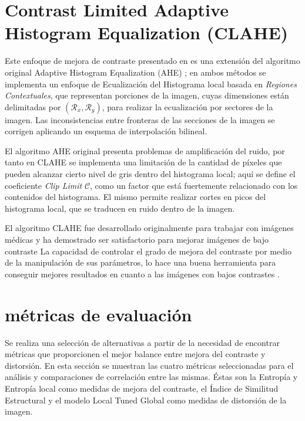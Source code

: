 \documentclass[spanish,twocolumn]{article}
\begin{document}

\section{Contrast Limited Adaptive Histogram Equalization (CLAHE)}
\label{sec:clahe}
Este enfoque de mejora de contraste presentado en \cite{Zuiderveld:1994:CLA:180895.180940} es una extensión del algoritmo original Adaptive Histogram Equalization (AHE) \cite{pizer1987adaptive}; en ambos métodos se implementa un enfoque de Ecualización del Histograma local basada en {\it Regiones Contextuales}, que representan porciones de la imagen, cuyas dimensiones están delimitadas por $(\mathcal{R}_x, \mathcal{R}_y)$, para realizar la ecualización por sectores de la imagen. Las inconsistencias entre fronteras de las secciones de la imagen se corrigen aplicando un esquema de interpolación bilineal. 

El algoritmo AHE original presenta problemas de amplificación del ruido, por tanto en CLAHE se implementa una limitación de la cantidad de píxeles que pueden alcanzar cierto nivel de gris dentro del histograma local; aquí se define el coeficiente {\it Clip Limit} $\mathcal{C}$, como un factor que está fuertemente relacionado con los contenidos del histograma. El mismo permite realizar cortes en picos del histograma local, que se traducen en ruido dentro de la imagen.

El algoritmo CLAHE fue desarrollado originalmente para trabajar con imágenes médicas y ha demostrado ser satisfactorio para mejorar imágenes de bajo contraste \cite{SMG11,MR13}
La capacidad de controlar el grado de mejora del contraste por medio de la manipulación de sus parámetros, lo hace una buena herramienta para conseguir mejores resultados en cuanto a las imágenes con bajos contrastes \cite{morebrizuela2014}. 


\section{métricas de evaluación}
\label{sec:metricas}
Se realiza una selección de alternativas a partir de la necesidad de encontrar métricas que proporcionen el mejor balance entre mejora del contraste y distorsión. En esta sección se muestran las cuatro métricas seleccionadas para el análisis y comparaciones de correlación entre las mismas. Éstas son la Entropía y Entropía local como medidas de mejora del contraste, el Índice de Similitud Estructural y el modelo Local Tuned Global como medidas de distorsión de la imagen.
\end{document}
